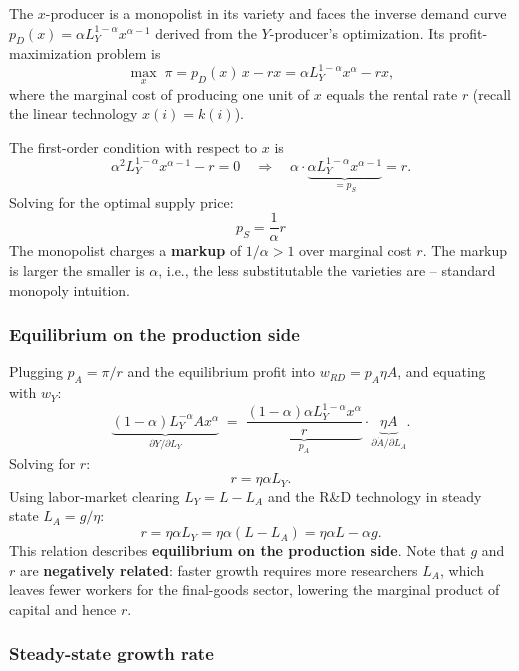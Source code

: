 \begin{tcolorbox}[
    colback=blue!1!white,
    colframe=blue!40!white,
    title=Derivation: Monopoly Markup $p_S = r/\alpha$,
    fonttitle=\bfseries
    ]
The $x$-producer is a monopolist in its variety and faces the inverse demand curve $p_D(x) = \alpha L_Y^{1-\alpha} x^{\alpha-1}$ derived from the $Y$-producer's optimization. Its profit-maximization problem is
\[
    \max_x \; \pi = p_D(x)\, x - r x = \alpha L_Y^{1-\alpha} x^\alpha - r x,
\]
where the marginal cost of producing one unit of $x$ equals the rental rate $r$ (recall the linear technology $x(i) = k(i)$).

The first-order condition with respect to $x$ is
\[
    \alpha^2 L_Y^{1-\alpha} x^{\alpha-1} - r = 0 \quad \Longrightarrow \quad \alpha \cdot \underbrace{\alpha L_Y^{1-\alpha} x^{\alpha-1}}_{= p_S} = r.
\]
Solving for the optimal supply price:
\[
    \boxed{\; p_S = \frac{1}{\alpha} r \;}
\]
The monopolist charges a \textbf{markup} of $1/\alpha > 1$ over marginal cost $r$. The markup is larger the smaller is $\alpha$, i.e., the less substitutable the varieties are -- standard monopoly intuition.
\end{tcolorbox}


\subsubsection{Equilibrium on the production side}

Plugging $p_A = \pi/r$ and the equilibrium profit into $w_{RD} = p_A \eta A$, and equating with $w_Y$:
\[
    \underbrace{(1-\alpha) L_Y^{-\alpha} A x^\alpha}_{\partial Y/\partial L_Y} \;=\; \underbrace{\frac{(1-\alpha)\alpha L_Y^{1-\alpha} x^\alpha}{r}}_{p_A} \cdot \underbrace{\eta A}_{\partial \dot{A}/\partial L_A}.
\]
Solving for $r$:
\[
    r = \eta \alpha L_Y.
\]
Using labor-market clearing $L_Y = L - L_A$ and the R\&D technology in steady state $L_A = g/\eta$:
\[
    r = \eta \alpha L_Y = \eta \alpha (L - L_A) = \eta \alpha L - \alpha g.
\]
This relation describes \textbf{equilibrium on the production side}. Note that $g$ and $r$ are \textbf{negatively related}: faster growth requires more researchers $L_A$, which leaves fewer workers for the final-goods sector, lowering the marginal product of capital and hence $r$.

\subsubsection{Steady-state growth rate}

